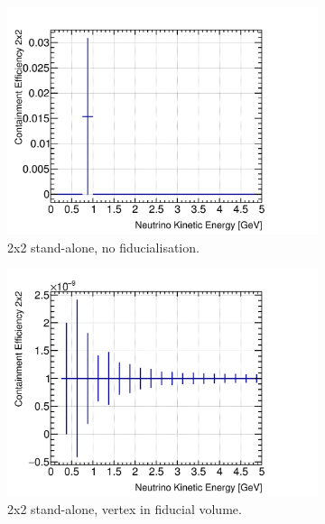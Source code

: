 \documentclass[10pt,a4paper,openany]{article}
\begin{document}
\begin{figure}[htbp]
	\centering
	\begin{subfigure}[b]{0.49\textwidth}
		\centering
		\includegraphics[width=1.0\textwidth]{E_cont_eff_2x2.png}
		\caption{2x2 stand-alone, no fiducialisation.}
		\label{}
	\end{subfigure}	
	\hfill
	\begin{subfigure}[b]{0.49\textwidth}
		\centering
    \includegraphics[width=1.0\textwidth]{E_cont_eff_2x2_fiducial.png}
		\caption{2x2 stand-alone, vertex in fiducial volume.}
		\label{}
	\end{subfigure}	
	\begin{subfigure}[b]{0.49\textwidth}
		\centering

\end{subfigure}
\end{figure}
\end{document}
